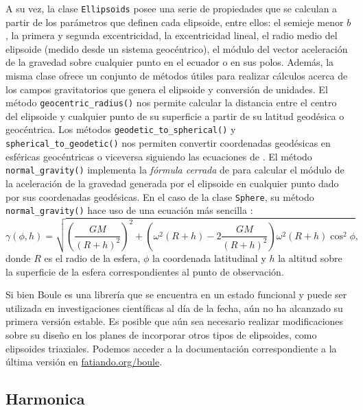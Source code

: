 A su vez, la clase \texttt{Ellipsoids} posee una serie de propiedades que se
calculan a partir de los parámetros que definen cada elipsoide, entre ellos: el
semieje menor $b$, la primera y segunda excentricidad, la excentricidad lineal,
el radio medio del elipsoide (medido desde un sistema geocéntrico), el módulo
del vector aceleración de la gravedad sobre cualquier punto en el ecuador o en
sus polos.
Además, la misma clase ofrece un conjunto de métodos útiles para realizar
cálculos acerca de los campos gravitatorios que genera el elipsoide
y conversión de unidades.
El método \texttt{geocentric\_radius()} nos permite calcular la distancia entre
el centro del elipsoide y cualquier punto de su superficie a partir de su
latitud geodésica o geocéntrica.
Los métodos \texttt{geodetic\_to\_spherical()}
y \texttt{spherical\_to\_geodetic()} nos permiten convertir coordenadas
geodésicas en esféricas geocéntricas o viceversa siguiendo las ecuaciones de
\citet{vermeille2002}.
El método \texttt{normal\_gravity()} implementa la \emph{fórmula cerrada} de
\citet{li2001a} para calcular el módulo de la aceleración de la gravedad
generada por el elipsoide en cualquier punto dado por sus coordenadas
geodésicas.
En el caso de la clase \texttt{Sphere}, su método \texttt{normal\_gravity()}
hace uso de una ecuación más sencilla \citep{heiskanen1967}:
%
\begin{equation}
    \gamma(\phi, h) =
        \sqrt{\left( \frac{GM}{(R + h)^2} \right)^2
        + \left(\omega^2 (R + h) - 2\frac{GM}{(R + h)^2} \right)
        \omega^2 (R + h) \cos^2 \phi},
\end{equation}
%
donde $R$ es el radio de la esfera, $\phi$ la coordenada latitudinal
y $h$ la altitud sobre la superficie de la esfera correspondientes al punto de
observación.

Si bien Boule es una librería que se encuentra en un estado funcional
y puede ser utilizada en investigaciones científicas al día de la fecha, aún no
ha alcanzado su primera versión estable.
Es posible que aún sea necesario realizar modificaciones sobre su diseño en los
planes de incorporar otros tipos de elipsoides, como elipsoides
triaxiales.
Podemos acceder a la documentación correspondiente a la última versión en
\href{https://www.fatiando.org/boule}{fatiando.org/boule}.


\subsection{Harmonica}
\label{sec:harmonica}

